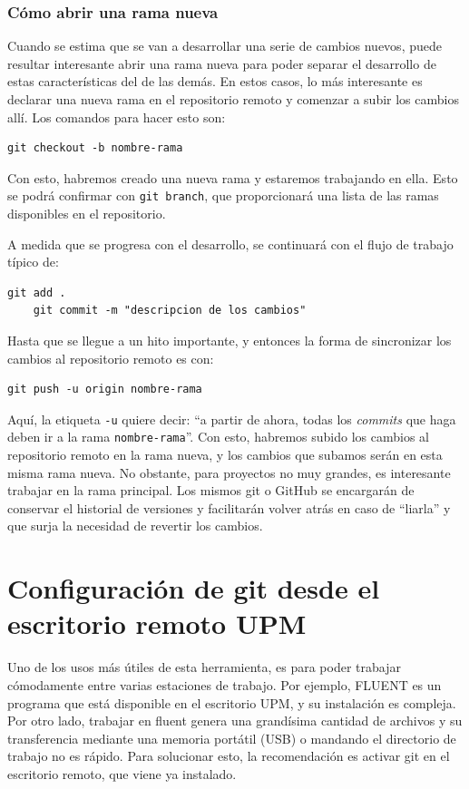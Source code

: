 \documentclass[
twoside,
12pt,                   
]{article}
\begin{document}
\subsubsection{Cómo abrir una rama nueva}
Cuando se estima que se van a desarrollar una serie de cambios nuevos, puede resultar interesante abrir una rama nueva para poder separar el desarrollo de estas características del de las demás. En estos casos, lo más interesante es declarar una nueva rama en el repositorio remoto y comenzar a subir los cambios allí. Los comandos para hacer esto son:
\begin{lstlisting}[style=powershell]
    git checkout -b nombre-rama
\end{lstlisting}
Con esto, habremos creado una nueva rama y estaremos trabajando en ella. Esto se podrá confirmar con \texttt{git branch}, que proporcionará una lista de las ramas disponibles en el repositorio. 
\par A medida que se progresa con el desarrollo, se continuará con el flujo de trabajo típico de:
\begin{lstlisting}[style=powershell]
    git add .
    git commit -m "descripcion de los cambios"
\end{lstlisting}
Hasta que se llegue a un hito importante, y entonces la forma de sincronizar los cambios al repositorio remoto es con:
\begin{lstlisting}[style=powershell]
    git push -u origin nombre-rama
\end{lstlisting}
Aquí, la etiqueta \texttt{-u} quiere decir: ``a partir de ahora, todas los \textit{commits} que haga deben ir a la rama \texttt{nombre-rama}''. Con esto, habremos subido los cambios al repositorio remoto en la rama nueva, y los cambios que subamos serán en esta misma rama nueva. No obstante, para proyectos no muy grandes, es interesante trabajar en la rama principal. Los mismos git o GitHub se encargarán de conservar el historial de versiones y facilitarán volver atrás en caso de ``liarla'' y que surja la necesidad de revertir los cambios.

\section{Configuración de git desde el escritorio remoto UPM}
Uno de los usos más útiles de esta herramienta, es para poder trabajar cómodamente entre varias estaciones de trabajo. Por ejemplo, FLUENT es un programa que está disponible en el escritorio UPM, y su instalación es compleja. Por otro lado, trabajar en fluent genera una grandísima cantidad de archivos y su transferencia mediante una memoria portátil (USB) o mandando el directorio de trabajo no es rápido. Para solucionar esto, la recomendación es activar git en el escritorio remoto, que viene ya instalado. 
\end{document}
